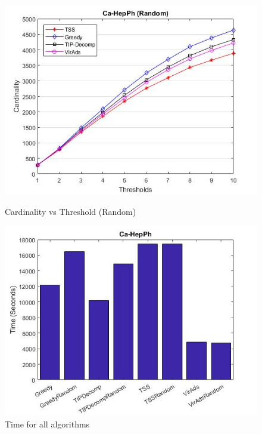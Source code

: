 \begin{figure}[h!]
\begin{minipage}[t]{0.50\textwidth}
\includegraphics[width=\linewidth,keepaspectratio=true]{images/ca-hepphresultrandom.jpg}
\caption{Cardinality vs Threshold (Random)}

\end{minipage}
\begin{minipage}[t]{0.50\textwidth}
\includegraphics[width=\linewidth,keepaspectratio=true]{images/hepphtime.jpg}
\caption{Time for all algorithms}
\end{minipage}
\end{figure}

